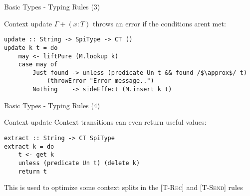 \begin{frame}[fragile]{Basic Types - Typing Rules (3)}

    \begin{exampleblock}{Context update}
        $\Gamma + (x : T)$ throws an error if the conditions arent met:
        \small\begin{verbatim}
update :: String -> SpiType -> CT ()
update k t = do
    may <- liftPure (M.lookup k)
    case may of
        Just found -> unless (predicate Un t && found /$\approx$/ t) 
            (throwError "Error message..")
        Nothing    -> sideEffect (M.insert k t)
        \end{verbatim}
    \end{exampleblock}
    
\end{frame}


\begin{frame}[fragile]{Basic Types - Typing Rules (4)}

    \begin{exampleblock}{Context update}
        Context transitions can even return useful values:
        \small\begin{verbatim}
extract :: String -> CT SpiType
extract k = do
    t <- get k
    unless (predicate Un t) (delete k)
    return t
        \end{verbatim}
    \end{exampleblock}

    This is used to optimize some context splits in the [\textsc{T-Rec}] and [\textsc{T-Send}] rules

\end{frame}

